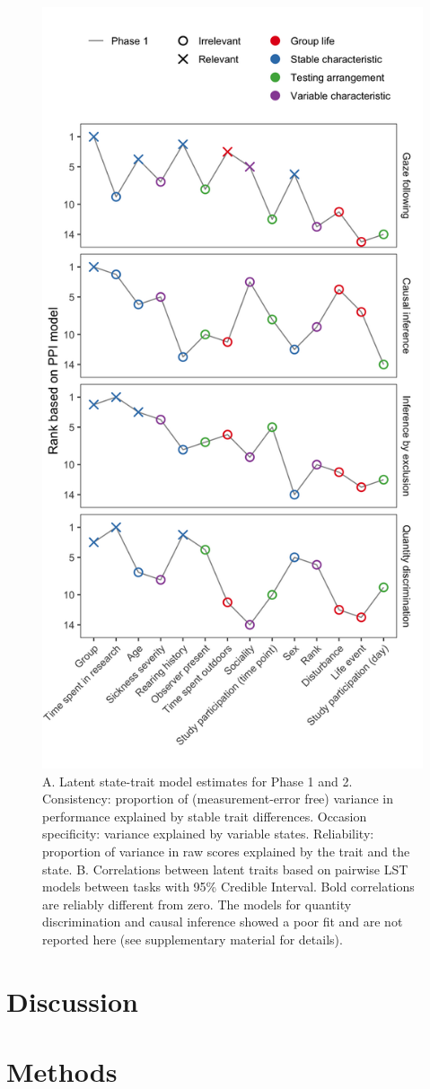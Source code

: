 \documentclass[
  man,floatsintext]{apa6}
\begin{document}
\begin{figure}

{\centering \includegraphics[width=0.5\linewidth]{./figures/ppi} 

}

\caption{A. Latent state-trait model estimates for Phase 1 and 2. Consistency: proportion of (measurement-error free) variance in performance explained by stable trait differences. Occasion specificity: variance explained by variable states. Reliability: proportion of variance in raw scores explained by the trait and the state. B. Correlations between latent traits based on pairwise LST models between tasks with 95\% Credible Interval. Bold correlations are reliably different from zero. The models for quantity discrimination and causal inference showed a poor fit and are not reported here (see supplementary material for details).}\label{fig:ppiplot}
\end{figure}

\hypertarget{discussion}{%
\section{Discussion}\label{discussion}}

\hypertarget{methods}{%
\section{Methods}\label{methods}}
\end{document}
